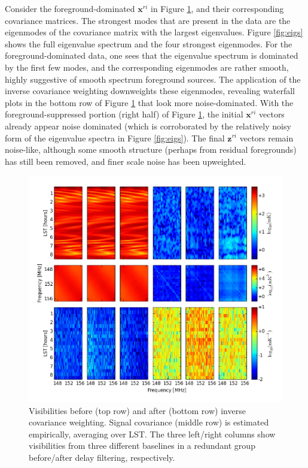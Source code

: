 \documentclass[twocolumn,numberedappendix]{emulateapj} \shorttitle{PSA64}
\begin{document}
Consider the foreground-dominated $\mathbf{x}^{ri}$ in Figure \ref{fig:inv_cov}, and
their corresponding covariance matrices. The strongest modes that are present in the
data are the eigenmodes of the covariance matrix with the largest eigenvalues. Figure
\ref{fig:eigs} shows the full eigenvalue spectrum and the four strongest eigenmodes.
For the foreground-dominated data, one sees that the eigenvalue spectrum is dominated
by the first few modes, and the corresponding eigenmodes are rather smooth, highly suggestive
of smooth spectrum foreground sources. The application of the inverse covariance weighting
downweights these eigenmodes, revealing waterfall plots in the bottom row of Figure \ref{fig:inv_cov}
that look more noise-dominated. With the foreground-suppressed portion (right half) of Figure \ref{fig:inv_cov},
the initial $\mathbf{x}^{ri}$ vectors already appear noise dominated (which is corroborated by the
relatively noisy form of the eigenvalue spectra in Figure \ref{fig:eigs}). The final $\mathbf{z}^{ri}$ vectors
remain noise-like, although some smooth structure (perhaps from residual foregrounds) has still been removed, and finer scale noise
has been upweighted.

\begin{figure}\centering
\includegraphics[width=2\columnwidth]{plots/inv_cov.png}
\caption{
Visibilities before (top row) and after (bottom row) inverse covariance weighting.
Signal covariance (middle row) is estimated empirically, averaging over LST.
The three left/right columns show visibilities from
three different baselines in a redundant group before/after delay filtering, respectively.
} \label{fig:inv_cov}
\end{figure}
\end{document}
